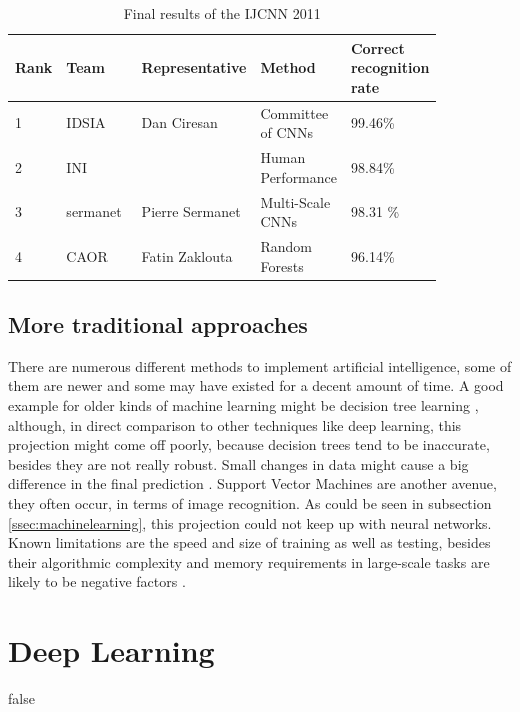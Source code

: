 \begin{table}[h]
	\begin{tabular}{||p{0.05\linewidth} | p{0.2\linewidth}|p{0.2\linewidth}|p{0.2\linewidth}|p{0.2\linewidth}||}
		\hline
		Rank  &    Team & Representative &    Method &    Correct recognition rate\\
		\hline
		\hline
		1 & IDSIA & Dan Ciresan & Committee of CNNs &    99.46\% \\
		\hline
		2 &    INI & & Human Performance & 98.84\% \\
		\hline
		3 & sermanet & Pierre Sermanet & Multi-Scale CNNs & 98.31 \% \\
		\hline
		4 & CAOR & Fatin Zaklouta & Random Forests &    96.14\% \\
		\hline
		
	\end{tabular}
	\caption{Final results of the IJCNN 2011}
	\label{table:icjnn2011}
	
\end{table}

\subsection{More traditional approaches}
There are numerous different methods to implement artificial intelligence, some of them are newer and some may have existed for a decent amount of time. 
A good example for older kinds of machine learning might be decision tree learning \cite{decision}, although, in direct comparison to other techniques like deep learning, this projection might come off poorly, because decision trees tend to be inaccurate, besides they are not really robust. Small changes in data might cause a big difference in the final prediction \cite{decisionbook}. \newline
Support Vector Machines are another avenue, they often occur, in terms of image recognition. As could be seen in subsection \ref{ssec:machinelearning}, this projection could not keep up with neural networks. Known limitations are the speed and size of training as well as testing, besides their algorithmic complexity and memory requirements in large-scale tasks are likely to be negative factors \cite{burges}. 


\section{Deep Learning}


\if false

